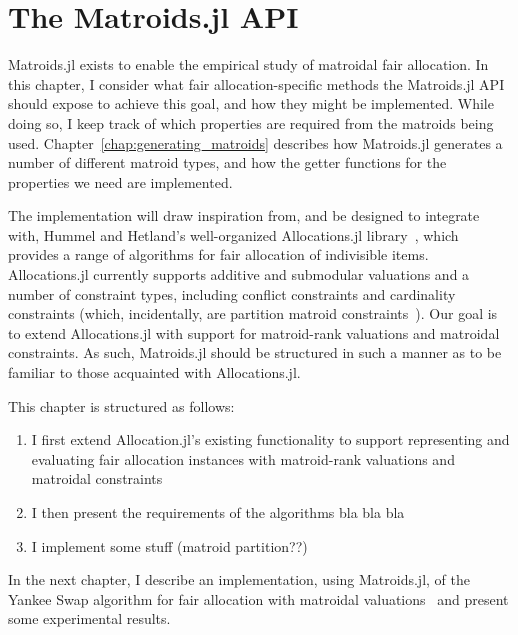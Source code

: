 \chapter{The Matroids.jl API}
\label{chap:matroids.jl}
Matroids.jl exists to enable the empirical study of matroidal fair allocation. In this chapter, I consider what fair allocation-specific methods the Matroids.jl API should expose to achieve this goal, and how they might be implemented. While doing so, I keep track of which properties are required from the matroids being used. Chapter~\ref{chap:generating_matroids} describes how Matroids.jl generates a number of different matroid types, and how the getter functions for the properties we need are implemented.

The implementation will draw inspiration from, and be designed to integrate with, Hummel and Hetland's well-organized Allocations.jl library~\cite{Hetland_Allocations_jl_2022}, which provides a range of algorithms for fair allocation of indivisible items. Allocations.jl currently supports additive and submodular valuations and a number of constraint types, including conflict constraints and cardinality constraints (which, incidentally, are partition matroid constraints~\cite{barman2020fair}). Our goal is to extend Allocations.jl with support for matroid-rank valuations and matroidal constraints. As such, Matroids.jl should be structured in such a manner as to be familiar to those acquainted with Allocations.jl.



This chapter is structured as follows:
\begin{enumerate}
    \item I first extend Allocation.jl's existing functionality to support representing and evaluating fair allocation instances with matroid-rank valuations and matroidal constraints
    \item I then present the requirements of the algorithms bla bla bla
    \item I implement some stuff (matroid partition??)
\end{enumerate}

In the next chapter, I describe an implementation, using Matroids.jl, of the Yankee Swap algorithm for fair allocation with matroidal valuations~\cite{viswanathan2023yankee} and present some experimental results.

